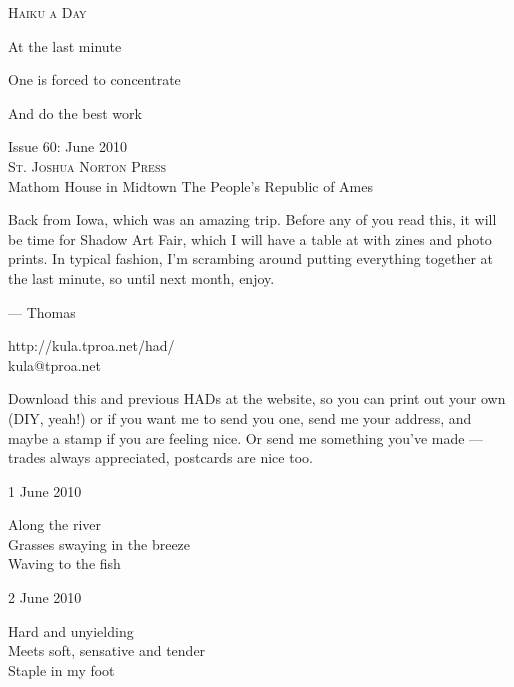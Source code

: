 \documentclass[12pt]{article}
\begin{document}
\begin{center}
{\fontsize{36}{48}\selectfont \textsc{Haiku a Day }}
\end{center}

\vspace*{3.5cm}

{\fontsize{20}{40}\selectfont 

At the last minute

One is forced to concentrate

And do the best work

}

\vspace*{5.0cm}
\begin{center}
{\large{Issue 60: June 2010}} \\[5mm]
{\fontsize{8}{8}\selectfont  \textsc{ St. Joshua Norton Press }} \\[1mm]
{\fontsize{6}{6}\selectfont Mathom House in Midtown \textbar The People's Republic of Ames }
\end{center}


\newpage

Back from Iowa, which was an amazing trip. Before any
of you read this, it will be time for Shadow Art Fair,
which I will have a table at with zines and photo prints.
In typical fashion, I'm scrambing around putting everything
together at the last minute, so until next month, enjoy.

--- Thomas

http://kula.tproa.net/had/ \\
kula@tproa.net

Download this and previous HADs at the website, so you can
print out your own (DIY, yeah!) or if you want me to send
you one, send me your address, and maybe a stamp if you
are feeling nice. Or send me something you've made ---
trades always appreciated, postcards are nice too.

\vspace*{2.5cm}

1 June 2010

Along the river \\
Grasses swaying in the breeze \\
Waving to the fish

2 June 2010

Hard and unyielding \\
Meets soft, sensative and tender \\
Staple in my foot

\newpage
\end{document}

